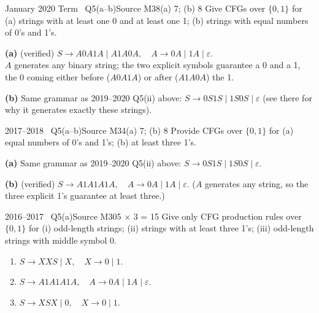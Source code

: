 \documentclass[11pt,a4paper]{article}
\newcommand{\eps}{\varepsilon}
\begin{document}
\begin{question}{January 2020 Term \textbullet\ Q5(a--b)}{Source M38}{(a) 7; (b) 8}
Give CFGs over $\{0,1\}$ for (a) strings with at least one 0 and at least one 1; (b) strings with equal numbers of 0's and 1's.
\end{question}
\begin{solution}
\textbf{(a)} (verified) $S\to A0A1A\mid A1A0A,\quad A\to0A\mid1A\mid\eps$. \\
$A$ generates any binary string; the two explicit symbols guarantee a 0 and a 1, the 0 coming either before ($A0A1A$) or after ($A1A0A$) the 1.

\textbf{(b)} Same grammar as 2019--2020 Q5(ii) above: $S\to0S1S\mid1S0S\mid\eps$ (see there for why it generates exactly these strings).
\end{solution}

\begin{question}{2017--2018 \textbullet\ Q5(a--b)}{Source M34}{(a) 7; (b) 8}
Provide CFGs over $\{0,1\}$ for (a) equal numbers of 0's and 1's; (b) at least three 1's.
\end{question}
\begin{solution}
\textbf{(a)} Same grammar as 2019--2020 Q5(ii) above: $S\to0S1S\mid1S0S\mid\eps$.

\textbf{(b)} (verified) $S\to A1A1A1A,\quad A\to0A\mid1A\mid\eps$. ($A$ generates any string, so the three explicit 1's guarantee at least three.)
\end{solution}

\begin{question}{2016--2017 \textbullet\ Q5(a)}{Source M30}{5 $\times$ 3 = 15}
Give only CFG production rules over $\{0,1\}$ for (i) odd-length strings; (ii) strings with at least three 1's; (iii) odd-length strings with middle symbol 0.
\end{question}
\begin{solution}
\begin{enumerate}
\item $S\to XXS\mid X,\quad X\to0\mid1$.
\item $S\to A1A1A1A,\quad A\to0A\mid1A\mid\eps$.
\item $S\to XSX\mid0,\quad X\to0\mid1$.
\end{enumerate}
\end{solution}
\end{document}
